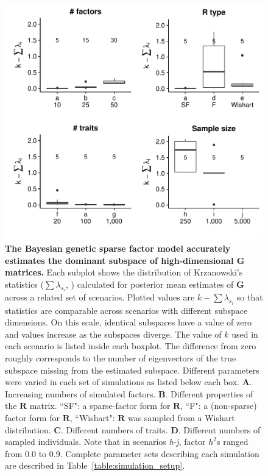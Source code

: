 \documentclass[12pt,titlepage]{article}
\begin{document}
\begin{figure}[b]
\begin{center}
\includegraphics[width=5in]{Figures/K_dists_G.pdf}
\caption[Krzanowski substance comparison statistics for G by scenario]{ \textbf{The Bayesian genetic sparse factor model accurately estimates the dominant subspace of high-dimensional G matrices.} Each subplot shows the distribution of Krzanowski's statistics ($\sum \lambda_{s_i}$, ) calculated for posterior mean estimates of $\mathbf{G}$ across a related set of scenarios. Plotted values are $k - \sum \lambda_{s_i}$ so that statistics are comparable across scenarios with different subspace dimensions. On this scale, identical subspaces have a value of zero and values increase as the subspaces diverge. The value of $k$ used in each scenario is listed inside each boxplot. The difference from zero roughly corresponds to the number of eigenvectors of the true subspace missing from the estimated subspace. Different parameters were varied in each set of simulations as listed below each box. \textbf{A}. Increasing numbers of simulated factors. \textbf{B}. Different properties of the $\mathbf{R}$ matrix. ``SF": a sparse-factor form for $\mathbf{R}$, ``F": a (non-sparse) factor form for $\mathbf{R}$, ``Wishart": $\mathbf{R}$ was sampled from a Wishart distribution. \textbf{C}. Different numbers of traits. \textbf{D}. Different numbers of sampled individuals. Note that in scenarios \emph{h}-\emph{j}, factor $h^2$s ranged from 0.0 to 0.9. Complete parameter sets describing each simulation are described in Table~\ref{table:simulation_setup}.}
\label{fig:Krzanowski_G}
\end{center}
\end{figure}
\end{document}
